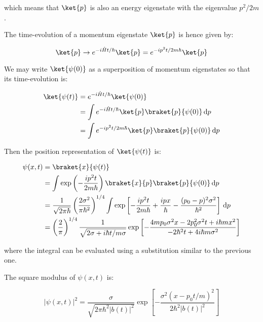 \documentclass[12pt]{article}
\begin{document}
which means that $\ket{p}$ is also an energy eigenstate with the eigenvalue $p^{2}/2m$. 

The time-evolution of a momentum eigenstate $\ket{p}$ is hence given by:

\begin{equation}
    \ket{p} \to e^{-i\hat{H}t/\hbar} \ket{p} = e^{-ip^{2}t/2m\hbar} \ket{p}
\end{equation}

We may write $\ket{\psi(0)}$ as a superposition of momentum eigenstates so that its time-evolution is:

\begin{equation}
\begin{split}
    \ket{\psi(t)} &= e^{-i\hat{H}t/\hbar} \ket{\psi(0)} \\
    &= \int e^{-i\hat{H}t/\hbar} \ket{p} \braket{p}{\psi(0)} \, \mathrm{d}p \\
    &= \int e^{-ip^{2}t/2m\hbar} \ket{p} \braket{p}{\psi(0)} \, \mathrm{d}p
\end{split}
\end{equation}

Then the position representation of $\ket{\psi(t)}$ is:

\begin{equation}
\begin{split}
    \psi(x, t) &= \braket{x}{\psi(t)} \\
    &= \int \exp \left( -\frac{ip^{2}t}{2m\hbar} \right) \braket{x}{p} \braket{p}{\psi(0)} \, \mathrm{d}p  \\
    &= \frac{1}{\sqrt{2\pi\hbar}} \left( \frac{2\sigma^{2}}{\pi \hbar^{2}} \right)^{1/4} \int \exp \left[ -\frac{ip^{2}t}{2m\hbar} + \frac{ipx}{\hbar} - \frac{(p_{0} - p)^{2}\sigma^{2}}{\hbar^{2}} \right] \, \mathrm{d}p \\
    &= \left( \frac{2}{\pi} \right)^{1/4} \frac{1}{\sqrt{2\sigma + i\hbar t/m\sigma}} \exp \left[ -\frac{4mp_{0} \sigma^{2} x - 2p_{0}^{2} \sigma^{2} t + i\hbar mx^{2}}{-2\hbar^{2} t + 4i\hbar m \sigma^{2}} \right]
\end{split}
\end{equation}

where the integral can be evaluated using a substitution similar to the previous one.

The square modulus of $\psi(x, t)$ is:

\begin{equation}
    \left| \psi(x, t) \right|^{2} = \frac{\sigma}{\sqrt{2\pi \hbar^{2} \left\lvert b(t) \right\rvert^{2}}} \exp \left[ -\frac{\sigma^{2} (x - p_{0}t/m)^{2}}{2\hbar^{2} \left\lvert b(t) \right\rvert^{2}} \right]
\end{equation}
\end{document}
